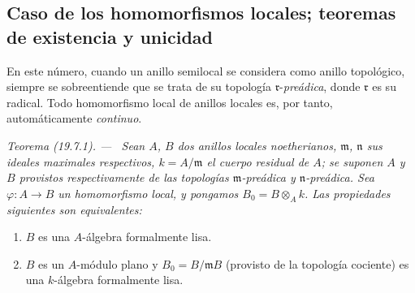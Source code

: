 \documentclass[10pt,oneside]{book}
\makeatletter
\newcommand{\setmanualcurrentlabel}[1]{\def\@currentlabel{#1}}
\newcommand{\oldpage}[2][]{%
  \setcounter{footnote}{0}%
  \marginpar{\scriptsize\textbf{#1}~|~#2}\ignorespaces}
\newenvironment{theorem}[1][]{%
  \setmanualcurrentlabel{#1}\par\medskip\noindent\itshape Teorema (#1). ---\ }{\par}
\makeatother
\begin{document}
\subsection{Caso de los homomorfismos locales; teoremas de existencia y
unicidad}
\label{subsection:0.19.7-es}

En este número, cuando un anillo semilocal se considera como anillo
topológico, siempre se sobreentiende que se trata de su topología
$\mathfrak r$-\emph{preádica}, donde $\mathfrak r$ es su radical. Todo homomorfismo
local de anillos locales es, por tanto, automáticamente \emph{continuo}.

\begin{theorem}[19.7.1]
\label{0.19.7.1-es}
Sean $A$, $B$ dos anillos locales noetherianos, $\mathfrak m$, $\mathfrak n$
sus ideales maximales respectivos, $k=A/\mathfrak m$ el cuerpo residual de $A$;
se suponen $A$ y $B$ provistos respectivamente de las topologías
$\mathfrak m$-preádica y $\mathfrak n$-preádica. Sea
$\varphi:A\to B$ un homomorfismo local, y pongamos $B_0=B\otimes_A k$.
Las propiedades siguientes son equivalentes:
\begin{enumerate}
  \item[\textup{a)}] $B$ es una $A$-álgebra formalmente lisa.

\oldpage[0\textsubscript{IV-1}]{105}

  \item[\textup{b)}] $B$ es un $A$-módulo plano y
  $B_0=B/\mathfrak mB$ (provisto de la topología cociente) es una $k$-álgebra
  formalmente lisa.
\end{enumerate}
\end{theorem}
\end{document}
